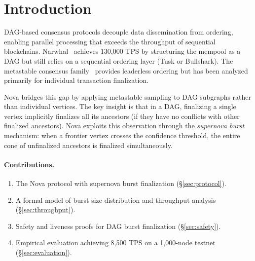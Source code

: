 \section{Introduction}

\label{sec:introduction}

DAG-based consensus protocols decouple data dissemination from ordering, enabling
parallel processing that exceeds the throughput of sequential blockchains.
Narwhal~\cite{danezis2022narwhal} achieves 130,000 TPS by structuring the mempool
as a DAG but still relies on a sequential ordering layer (Tusk or Bullshark).
The metastable consensus family~\cite{rocket2019wave} provides leaderless ordering
but has been analyzed primarily for individual transaction finalization.

Nova bridges this gap by applying metastable sampling to DAG subgraphs rather than
individual vertices. The key insight is that in a DAG, finalizing a single vertex
implicitly finalizes all its ancestors (if they have no conflicts with other finalized
ancestors). Nova exploits this observation through the \emph{supernova burst} mechanism:
when a frontier vertex crosses the confidence threshold, the entire cone of unfinalized
ancestors is finalized simultaneously.

\paragraph{Contributions.}
\begin{enumerate}[nosep]
\item The Nova protocol with supernova burst finalization (\S\ref{sec:protocol}).
\item A formal model of burst size distribution and throughput analysis (\S\ref{sec:throughput}).
\item Safety and liveness proofs for DAG burst finalization (\S\ref{sec:safety}).
\item Empirical evaluation achieving 8,500 TPS on a 1,000-node testnet (\S\ref{sec:evaluation}).
\end{enumerate}

